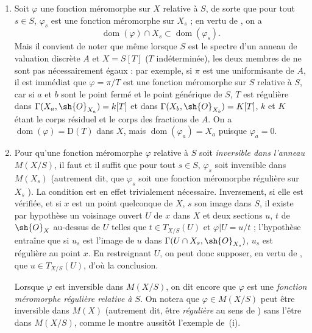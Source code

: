 \begin{remarks}[20.6.5]
\begin{enumerate}[label=(\roman*)]
  \item Soit $\varphi$ une fonction méromorphe sur $X$ relative à $S$, de sorte que pour tout $s\in S$, $\varphi_s$ est une fonction méromorphe sur $X_s$  ; en vertu de , on a
  \[
  \label{IV.20.6.5.1}
    \operatorname{dom}(\varphi)\cap X_s\subset\operatorname{dom}(\varphi_s).
    \tag{20.6.5.1}
  \]
  Mais il convient de noter que même lorsque $S$ est le spectre d'un anneau de valuation discrète $A$ et $X=S[T]$ ($T$ indéterminée), les deux membres de  ne sont pas nécessairement égaux : par exemple, si $\pi$ est une uniformisante de $A$, il est immédiat que $\varphi=\pi/T$ est une fonction méromorphe sur $S$ relative à $S$, car si $a$ et $b$ sont le point fermé et le point générique de $S$, $T$ est régulière dans $\Gamma(X_a,\sh{O}_{X_a})=k[T]$ et dans $\Gamma(X_b,\sh{O}_{X_b})=K[T]$, $k$ et $K$ étant le corps résiduel et le corps des fractions de $A$.
  On a $\operatorname{dom}(\varphi)=\mathrm{D}(T)$ dans $X$, mais $\operatorname{dom}(\varphi_a)=X_a$ puisque $\varphi_a=0$.

  \item Pour qu'une fonction méromorphe $\varphi$ relative à $S$ soit \emph{inversible dans l'anneau} $M(X/S)$, il faut et il suffit que pour tout $s\in S$, $\varphi_s$ soit inversible dans $M(X_s)$ (autrement dit, que $\varphi_s$ soit une fonction méromorphe régulière sur $X_s$ ).
  La condition est
  en effet trivialement nécessaire.
  Inversement, si elle est vérifiée, et si $x$ est un point quelconque de $X$, $s$ son image dans $S$, il existe par hypothèse un voisinage ouvert $U$ de $x$ dans $X$ et deux sections $u$, $t$ de $\sh{O}_X$ au-dessus de $U$ telles que $t\in T_{X/S}(U)$ et $\varphi|U=u/t$ ; l'hypothèse entraîne que si $u_s$ est l'image de $u$ dans $\Gamma(U\cap X_s,\sh{O}_{X_s})$, $u_s$ est régulière au point $x$.
  En restreignant $U$, on peut donc supposer, en vertu de , que $u\in T_{X/S}(U)$, d'où la conclusion.

  Lorsque $\varphi$ est inversible dans $M(X/S)$, on dit encore que $\varphi$ est une \emph{fonction méromorphe régulière relative à $S$}.
  On notera que $\varphi\in M(X/S)$ peut être inversible dans $M(X)$ (autrement dit, être \emph{régulière} au sens de ) sans l'être dans $M(X/S)$, comme le montre aussitôt l'exemple de~(i).


\end{enumerate}
\end{remarks}
